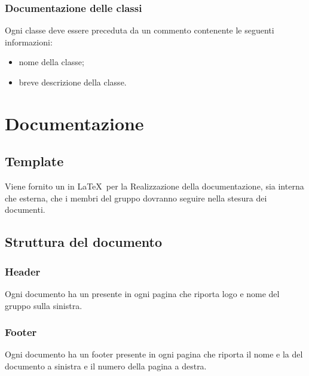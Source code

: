\subsubsection{Documentazione delle classi}
\label{5.3.3}
Ogni classe deve essere preceduta da un commento contenente le seguenti informazioni:
\begin{itemize}
\item {} nome della classe;
\item {} breve descrizione della classe.
\end{itemize}

\section{Documentazione}
\label{5.0}

\subsection{Template}
\label{5.1}
Viene fornito un  in \LaTeX\ per la Realizzazione della documentazione, sia interna che esterna, che i membri del gruppo dovranno seguire nella stesura dei documenti.

\subsection{Struttura del documento}
\label{5.2}

\subsubsection{Header}
\label{5.2.1}
Ogni documento ha un  presente in ogni pagina che riporta logo e nome del gruppo sulla sinistra.

\subsubsection{Footer}
\label{5.2.2}
Ogni documento ha un footer presente in ogni pagina che riporta il nome e la  del documento a sinistra e il numero della pagina a destra.

